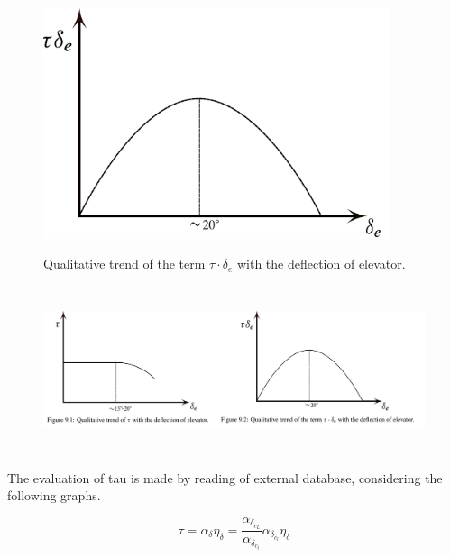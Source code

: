 \begin{figure}[H]
\centering
{\includegraphics[height=6.79cm]{Immagini/taudeltae.png}} 
\label{tau2}
\caption{Qualitative trend of the term $\tau \cdot \delta_e$ with the deflection of elevator.}
\end{figure} 		


\begin{figure}[H]
\centering
{\includegraphics[height=4.9cm]{Immagini/tau.png}} 
\label{tau3}
\end{figure} 		


		
The evaluation of tau is made by reading of external database, considering the following graphs.
	
\begin{equation}
\tau = \alpha_{\delta} \eta_{\delta} = \frac{\alpha_{{\delta}_{c_L}}}{\alpha_{{\delta}_{c_l}}}\alpha_{{\delta}_{c_l}} \eta_{\delta}
\end{equation}



%
%

